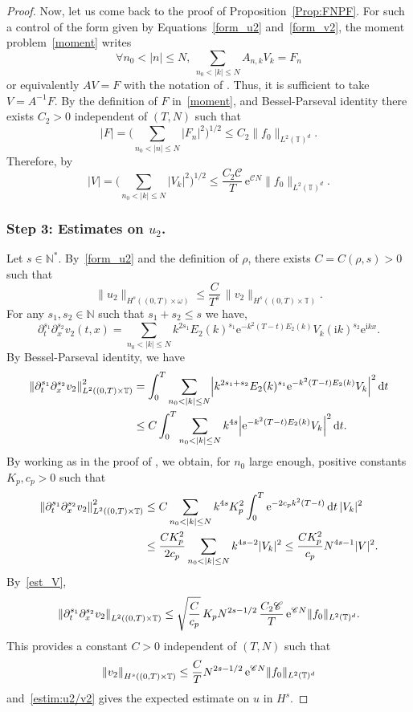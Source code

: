 \documentclass[10pt]{amsart}
\let\mathcal\mathscr
\theoremstyle{plain}
\theoremstyle{definition}
\theoremstyle{remark}
\newcommand{\diff}[1][-3]{\ensuremath{\mathop{}\mkern#1mu\mathrm{d}}}
\newcommand{\set}{\mathbb}
\newcommand{\N}{\set{N}}
\newcommand{\T}{\set{T}}
\newcommand{\eu}{\mathrm e}
\newcommand{\iu}{\mathrm i}
\let\originalleft\left
\let\originalright\right
\renewcommand{\left}{\mathopen{}\mathclose\bgroup\originalleft}
\renewcommand{\right}{\aftergroup\egroup\originalright}
\begin{document}
\begin{proof}
Now, let us come back to the proof of Proposition~\ref{Prop:FNPF}.
For such a control of the form given by Equations~\eqref{form_u2} and~\eqref{form_v2}, the moment problem~\eqref{moment} writes
\[
\forall n_0 < |n|\leq N, \
\sum_{n_0 < |k|\leq N} A_{n,k} V_k = F_n
\]
or equivalently $AV=F$ with the notation of .
Thus, it is sufficient to take $V=A^{-1}F$.
By the definition of $F$ in~\eqref{moment}, and Bessel-Parseval identity there exists $C_2>0$ independent of $(T,N)$ such that
\[
|F| = \biggl(\sum_{n_0<|n|\leq N} |F_n|^2 \biggr)^{1/2} \leq C_2 \|f_0\|_{L^2(\T)^d}.
\]
Therefore, by 
\begin{equation}\label{est_V}
|V| = \biggl(\sum_{n_0<|k|\leq N} |V_k|^2 \biggr)^{1/2} \leq \frac{C_2 \mathcal{C} }{T}\, \eu^{\mathcal{C}N} \|f_0 \|_{L^2(\T)^d}.
\end{equation}

\subsubsection*{Step 3: Estimates on $u_2$.} Let $s\in\N^*$. By~\eqref{form_u2} and the definition of $\rho$,
there exists $C=C(\rho,s)>0$ such that
\begin{equation} \label{estim:u2/v2}
\| u_2 \|_{H^s((0,T)\times\omega)} \leq \frac{C}{T^s}\, \|v_2\|_{H^s((0,T)\times\T)}.
\end{equation}
For any $s_1, s_2 \in \N$ such that $s_1+s_2 \leq s$ we have,
\[
\partial_t^{s_1} \partial_x^{s_2} v_2 (t,x) =
\sum_{n_0<|k|\leq N} k^{2s_1} E_2(k)^{s_1} \eu^{-k^2(T-t)E_2(k)} V_k (\iu k)^{s_2} \eu^{\iu kx}.
\]
By Bessel-Parseval identity, we have
\begin{align*}
\left\| \partial_t^{s_1} \partial_x^{s_2} v_2 \right\|_{L^2((0,T)\times\T)}^2
& = \int_0^T \sum_{n_0<|k|\leq N} \left| k^{2s_1+s_2} E_2(k)^{s_1} \eu^{-k^2(T-t)E_2(k)} V_k \right|^2 \diff t\\
& \leq C \int_0^T \sum_{n_0<|k|\leq N} k^{4s} \left| \eu^{-k^2(T-t)E_2(k)} V_k\right|^2 \diff t.
\end{align*}
By working as in the proof of , we obtain, for $n_0$ large enough, positive constants $K_p, c_p>0$ such that
\begin{align*}
\left\| \partial_t^{s_1} \partial_x^{s_2} v_2 \right\|_{L^2((0,T)\times\T)}^2
& \leq C \sum_{n_0<|k|\leq N} k^{4s} K_p^2 \int_0^T \eu^{-2c_pk^2(T-t)} \diff t\, |V_k|^2 \\
& \leq \frac{C K_p^2}{2c_p} \sum_{n_0<|k|\leq N} k^{4s-2} |V_k|^2 \leq \frac{C K_p^2}{c_p} N^{4s-1} |V|^2.
\end{align*}
By~\eqref{est_V},
\[
\left\|\partial_t^{s_1} \partial_x^{s_2} v_2 \right\|_{L^2((0,T)\times\T)}
\leq \sqrt{\frac{C}{c_p}}\, K_p N^{2s-1/2}\, \frac{C_2 \mathcal{C} }{T}\, \eu^{\mathcal{C}N} \|f_0 \|_{L^2(\T)^d}.
\]
This provides a constant $C>0$ independent of $(T,N)$ such that
\[
\left\| v_2 \right\|_{H^s((0,T)\times\T)}
\leq \frac{C}{T} N^{2s-1/2}\, \eu^{\mathcal{C}N} \|f_0 \|_{L^2(\T)^d}
\]
and~\eqref{estim:u2/v2} gives the expected estimate on $u$ in $H^s$.
\end{proof}
\end{document}
